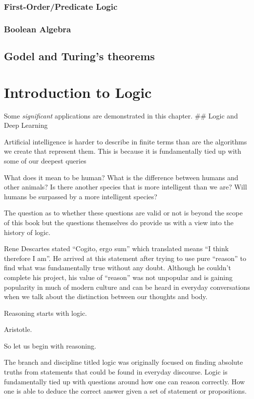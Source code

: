 \documentclass[]{book}
\theoremstyle{definition}
\theoremstyle{definition}
\theoremstyle{definition}
\theoremstyle{remark}
\begin{document}
\subsection{First-Order/Predicate
Logic}\label{first-orderpredicate-logic}

\subsection{Boolean Algebra}\label{boolean-algebra}

\section{Godel and Turing's theorems}\label{godel-and-turings-theorems}

\chapter{Introduction to Logic}\label{twologic}

Some \emph{significant} applications are demonstrated in this chapter.
\#\# Logic and Deep Learning

Artificial intelligence is harder to describe in finite terms than are
the algorithms we create that represent them. This is because it is
fundamentally tied up with some of our deepest queries

What does it mean to be human? What is the difference between humans and
other animals? Is there another species that is more intelligent than we
are? Will humans be surpassed by a more intelligent species?

The question as to whether these questions are valid or not is beyond
the scope of this book but the questions themselves do provide us with a
view into the history of logic.

Rene Descartes stated ``Cogito, ergo sum'' which translated means ``I
think therefore I am''. He arrived at this statement after trying to use
pure ``reason'' to find what was fundamentally true without any doubt.
Although he couldn't complete his project, his value of ``reason'' was
not unpopular and is gaining popularity in much of modern culture and
can be heard in everyday conversations when we talk about the
distinction between our thoughts and body.

Reasoning starts with logic.

Aristotle.

So let us begin with reasoning.

The branch and discipline titled logic was originally focused on finding
absolute truths from statements that could be found in everyday
discourse. Logic is fundamentally tied up with questions around how one
can reason correctly. How one is able to deduce the correct answer given
a set of statement or propositions.
\end{document}
